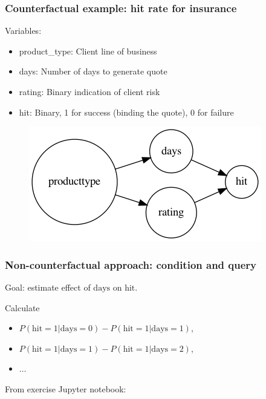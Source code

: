 \begin{frame}
    \frametitle{Counterfactual example: hit rate for insurance}
    Variables:
    \begin{itemize}
    \item product\_type: Client line of business
    \item days: Number of days to generate quote
    \item rating: Binary indication of client risk
    \item hit: Binary, 1 for success (binding the quote), 0 for failure\newline
    \end{itemize}

    \begin{figure}[ht]
    \includegraphics[height=0.6\textheight]{graphics/hits}
    \end{figure}
\end{frame}



\begin{frame}
\frametitle{Non-counterfactual approach: condition and query}

Goal: estimate effect of $\textrm{days}$ on $\textrm{hit}$.\newline

Calculate
\begin{itemize}
\item $P(\textrm{hit}=1 | \textrm{days} = 0) - P(\textrm{hit}=1 | \textrm{days} = 1)$,
\item $P(\textrm{hit}=1 | \textrm{days} = 1) - P(\textrm{hit}=1 | \textrm{days} = 2)$,
\item $\ldots$ \newline
\end{itemize}

From exercise Jupyter notebook:\newline

\end{frame}


